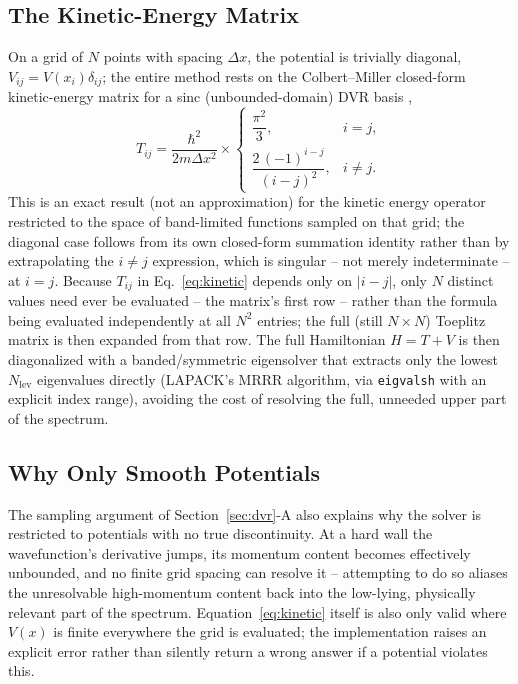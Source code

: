 \documentclass[10pt,conference]{IEEEtran}
\begin{document}
\subsection{The Kinetic-Energy Matrix}
\label{sec:kinetic}
On a grid of $N$ points with spacing $\Delta x$, the potential is trivially diagonal, $V_{ij}=V(x_i)\delta_{ij}$; the entire method rests on the Colbert--Miller closed-form kinetic-energy matrix for a sinc (unbounded-domain) DVR basis \cite{colbertmiller1992},
\begin{equation}
T_{ij} = \frac{\hbar^2}{2m\Delta x^2}\times
\begin{cases}
\dfrac{\pi^2}{3}, & i=j,\\[4pt]
\dfrac{2\,(-1)^{i-j}}{(i-j)^2}, & i\neq j.
\end{cases}
\label{eq:kinetic}
\end{equation}
This is an exact result (not an approximation) for the kinetic energy operator restricted to the space of band-limited functions sampled on that grid; the diagonal case follows from its own closed-form summation identity rather than by extrapolating the $i\neq j$ expression, which is singular -- not merely indeterminate -- at $i=j$. Because $T_{ij}$ in Eq.~\eqref{eq:kinetic} depends only on $|i-j|$, only $N$ distinct values need ever be evaluated -- the matrix's first row -- rather than the formula being evaluated independently at all $N^2$ entries; the full (still $N\times N$) Toeplitz matrix is then expanded from that row. The full Hamiltonian $H=T+V$ is then diagonalized with a banded/symmetric eigensolver that extracts only the lowest $N_{\text{lev}}$ eigenvalues directly (LAPACK's MRRR algorithm, via \texttt{eigvalsh} with an explicit index range), avoiding the cost of resolving the full, unneeded upper part of the spectrum.

\subsection{Why Only Smooth Potentials}
The sampling argument of Section~\ref{sec:dvr}-A also explains why the solver is restricted to potentials with no true discontinuity. At a hard wall the wavefunction's derivative jumps, its momentum content becomes effectively unbounded, and no finite grid spacing can resolve it -- attempting to do so aliases the unresolvable high-momentum content back into the low-lying, physically relevant part of the spectrum. Equation~\eqref{eq:kinetic} itself is also only valid where $V(x)$ is finite everywhere the grid is evaluated; the implementation raises an explicit error rather than silently return a wrong answer if a potential violates this.
\end{document}
